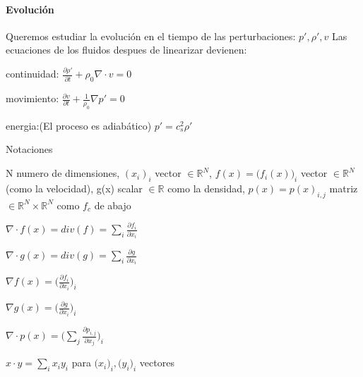 \documentclass{article}
\begin{document}
\paragraph{Evolución}
Queremos estudiar la evolución en el tiempo de las perturbaciones: $p\prime, \rho\prime, v$
Las ecuaciones de los fluidos despues de linearizar devienen:
\begin{description}  
\item continuidad: $ \frac{\partial \rho\prime}{\partial t} + \rho_0 \nabla \cdot v = 0 $
\item movimiento: $ \frac{\partial v}{\partial t} + \frac{1}{\rho_0} \nabla p\prime = 0 $
\item energia:(El proceso es adiabático) $p\prime = c_s^{2} \rho\prime$

\end{description} 
Notaciones
\begin{description}  
\item N numero de dimensiones, $(x_i)_i$ vector $\in \mathbb{R}^N $, $f(x)=\big(f_i(x)\big)_i$ vector $\in \mathbb{R}^N $(como la velocidad), g(x) scalar $\in \mathbb{R}$
como la densidad, $p(x) = p(x)_{i,j}$ matriz $\in \mathbb{R}^N \times \mathbb{R}^N $ como $f_c$ de abajo
\item $\nabla \cdot f(x) = div(f) = \sum_i\frac{\partial f_i}{\partial x_i}$
\item $\nabla \cdot g(x) = div(g) = \sum_i\frac{\partial g}{\partial x_i}$
\item $\nabla f(x) = \big(\frac{\partial f_i}{\partial x_i}\big)_i$
\item $\nabla g(x) = \big(\frac{\partial g}{\partial x_i}\big)_i$
\item $\nabla \cdot p(x) = \big(\sum_j\frac{\partial p_{i,j}}{\partial x_j}\big)_i$
\item $x \cdot y = \sum_{i} x_i y_i$ para $\big(x_i\big)_i , \big(y_i\big)_i$ vectores
\end{description} 
 
\end{document}
